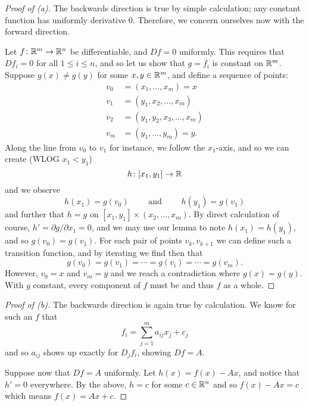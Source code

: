 \documentclass{article}
\begin{document}
\begin{proof}[Proof of (a)]
  The backwards direction is true by simple calculation; any constant function has uniformly derivative 0.
  Therefore, we concern ourselves now with the forward direction.

  Let $f \from \RR[m] \to \RR[n]$ be differentiable, and $Df = 0$ uniformly.
  This requires that $Df_{i} = 0$ for all $1 \le i \le n$, and so let us show that $g = f_{i}$ is constant on $\RR[m]$.
  Suppose $g(x) \ne g(y)$ for some $x, y \in \RR[m]$, and define a sequence of points:
  \begin{align*}
    v_{0} &= (x_{1}, \ldots, x_{m}) = x\\
    v_{1} &= (y_{1}, x_{2}, \ldots, x_{m})\\
    v_{2} &= (y_{1}, y_{2}, x_{3}, \ldots, x_{m})\\
    v_{m} &= (y_{1}, \ldots, y_{m}) = y.
  \end{align*}
  Along the line from $v_{0}$ to $v_{1}$ for instance, we follow the $x_{1}$-axis, and so we can create
  (WLOG $x_{1} < y_{1}$)
  \[ h \from [x_{1}, y_{1}] \to \RR \]
  and we observe
  \[ h(x_{1}) = g(v_{0}) \qquad \text{ and } \qquad h(y_{1}) = g(v_{1}) \]
  and further that $h = g$ on $[x_{1}, y_{1}] \times (x_{2}, \ldots, x_{m})$.
  By direct calculation of course, $h' = \partial g/\partial x_{1} = 0$, and we may use our lemma to note $h(x_{1}) = h(y_{1})$, and so $g(v_{0}) = g(v_{1})$.
  For each pair of points $v_{k}, v_{k + 1}$ we can define such a transition function, and by iterating we find then that
  \[ g(v_{0}) = g(v_{1}) = \cdots = g(v_{i}) = \cdots = g(v_{m}). \]
  However, $v_{0} = x$ and $v_{m} = y$ and we reach a contradiction where $g(x) = g(y)$.
  With $g$ constant, every component of $f$ must be and thus $f$ as a whole.
\end{proof}

\begin{proof}[Proof of (b)]
  The backwards direction is again true by calculation. We know for such an $f$ that
  \[ f_{i} = \sum_{j = 1}^{m}a_{ij}x_{j} + c_{j} \]
  and so $a_{ij}$ shows up exactly for $D_{j}f_{i}$, showing $Df = A$.

  Suppose now that $Df = A$ uniformly. Let $h(x) = f(x) - Ax$, and notice that $h' = 0$ everywhere.
  By the above, $h = c$ for some $c \in \RR[n]$ and so $f(x) - Ax = c$ which means $f(x) = Ax + c$.
\end{proof}
\end{document}
